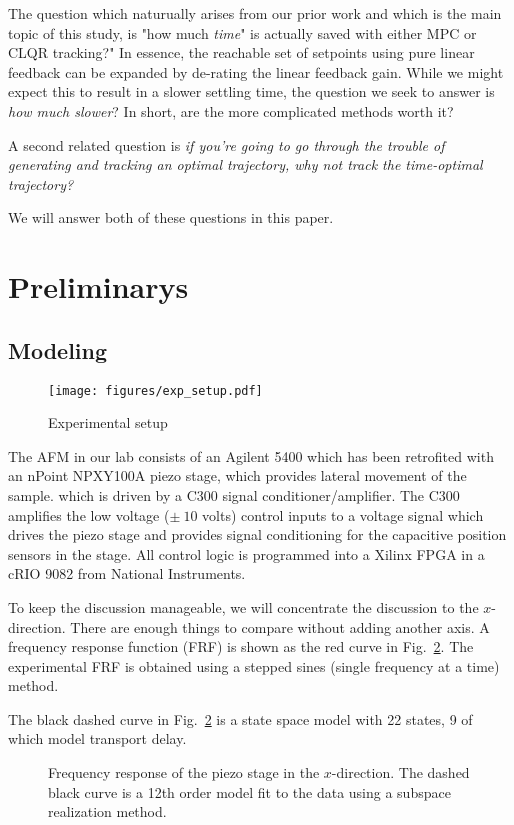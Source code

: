 \documentclass[journal,12pt,onecolumn,draftclsnofoot,,twoside]{IEEEtran/IEEEtran}
\begin{document}
The question which naturually arises from our prior work and which is the main topic of this study, is "how much \emph{time}" is actually saved with either MPC or CLQR tracking?" In essence, the reachable set of setpoints using pure linear feedback can be expanded by de-rating the linear feedback gain. While we might expect this to result in a slower settling time, the question we seek to answer is \emph{how much slower}? In short, are the more complicated methods worth it?

A second related question is \emph{if you're going to go through the trouble of generating and tracking an optimal trajectory, why not track the time-optimal trajectory?}

We will answer both of these questions in this paper. 




\section{Preliminarys}
\label{sec:orgbc45dd3}
\subsection{Modeling}
\begin{figure}
  \texttt{[image: figures/exp\_setup.pdf]}
  \caption{Experimental setup}
  \label{fig:exp_setup}
\end{figure}
The AFM in our lab consists of an Agilent 5400 which has been retrofited with an nPoint NPXY100A piezo stage, which provides lateral movement of the sample. which is driven by a C300 signal conditioner/amplifier. The C300 amplifies the low voltage ($\pm~10$ volts) control inputs to a voltage signal which drives the piezo stage and provides signal conditioning for the capacitive position sensors in the stage. All control logic is programmed into a Xilinx FPGA in a cRIO 9082 from National Instruments.


To keep the discussion manageable, we will concentrate the discussion to the $x$-direction.  There are enough things to compare without adding another axis. A frequency response function (FRF) is shown as the red curve in Fig.~\ref{fig:frf_xdir}. The experimental FRF is obtained using a stepped sines (single frequency at a time) method. 

The black dashed curve in Fig.~\ref{fig:frf_xdir} is a state space model with 22 states, 9 of which model transport delay.

\begin{figure}[ht!]
  \centering
  
  \caption{Frequency response of the piezo stage in the $x$-direction. The dashed black curve is a 12th order model fit to the data using a subspace realization method.}
    \label{fig:frf_xdir}
\end{figure}
\end{document}
